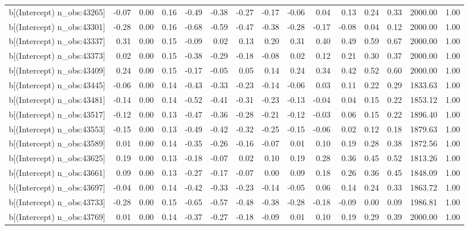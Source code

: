 \begin{table}[ht]
\begin{tabular}{rrrrrrrrrrrrrrr}
  b[(Intercept) n\_obs:43265] & -0.07 & 0.00 & 0.16 & -0.49 & -0.38 & -0.27 & -0.17 & -0.06 & 0.04 & 0.13 & 0.24 & 0.33 & 2000.00 & 1.00 \\ 
  b[(Intercept) n\_obs:43301] & -0.28 & 0.00 & 0.16 & -0.68 & -0.59 & -0.47 & -0.38 & -0.28 & -0.17 & -0.08 & 0.04 & 0.12 & 2000.00 & 1.00 \\ 
  b[(Intercept) n\_obs:43337] & 0.31 & 0.00 & 0.15 & -0.09 & 0.02 & 0.13 & 0.20 & 0.31 & 0.40 & 0.49 & 0.59 & 0.67 & 2000.00 & 1.00 \\ 
  b[(Intercept) n\_obs:43373] & 0.02 & 0.00 & 0.15 & -0.38 & -0.29 & -0.18 & -0.08 & 0.02 & 0.12 & 0.21 & 0.30 & 0.37 & 2000.00 & 1.00 \\ 
  b[(Intercept) n\_obs:43409] & 0.24 & 0.00 & 0.15 & -0.17 & -0.05 & 0.05 & 0.14 & 0.24 & 0.34 & 0.42 & 0.52 & 0.60 & 2000.00 & 1.00 \\ 
  b[(Intercept) n\_obs:43445] & -0.06 & 0.00 & 0.14 & -0.43 & -0.33 & -0.23 & -0.14 & -0.06 & 0.03 & 0.11 & 0.22 & 0.29 & 1833.63 & 1.00 \\ 
  b[(Intercept) n\_obs:43481] & -0.14 & 0.00 & 0.14 & -0.52 & -0.41 & -0.31 & -0.23 & -0.13 & -0.04 & 0.04 & 0.15 & 0.22 & 1853.12 & 1.00 \\ 
  b[(Intercept) n\_obs:43517] & -0.12 & 0.00 & 0.13 & -0.47 & -0.36 & -0.28 & -0.21 & -0.12 & -0.03 & 0.06 & 0.15 & 0.22 & 1896.40 & 1.00 \\ 
  b[(Intercept) n\_obs:43553] & -0.15 & 0.00 & 0.13 & -0.49 & -0.42 & -0.32 & -0.25 & -0.15 & -0.06 & 0.02 & 0.12 & 0.18 & 1879.63 & 1.00 \\ 
  b[(Intercept) n\_obs:43589] & 0.01 & 0.00 & 0.14 & -0.35 & -0.26 & -0.16 & -0.07 & 0.01 & 0.10 & 0.19 & 0.28 & 0.38 & 1872.56 & 1.00 \\ 
  b[(Intercept) n\_obs:43625] & 0.19 & 0.00 & 0.13 & -0.18 & -0.07 & 0.02 & 0.10 & 0.19 & 0.28 & 0.36 & 0.45 & 0.52 & 1813.26 & 1.00 \\ 
  b[(Intercept) n\_obs:43661] & 0.09 & 0.00 & 0.13 & -0.27 & -0.17 & -0.07 & 0.00 & 0.09 & 0.18 & 0.26 & 0.36 & 0.45 & 1848.09 & 1.00 \\ 
  b[(Intercept) n\_obs:43697] & -0.04 & 0.00 & 0.14 & -0.42 & -0.33 & -0.23 & -0.14 & -0.05 & 0.06 & 0.14 & 0.24 & 0.33 & 1863.72 & 1.00 \\ 
  b[(Intercept) n\_obs:43733] & -0.28 & 0.00 & 0.15 & -0.65 & -0.57 & -0.48 & -0.38 & -0.28 & -0.18 & -0.09 & 0.00 & 0.09 & 1986.81 & 1.00 \\ 
  b[(Intercept) n\_obs:43769] & 0.01 & 0.00 & 0.14 & -0.37 & -0.27 & -0.18 & -0.09 & 0.01 & 0.10 & 0.19 & 0.29 & 0.39 & 2000.00 & 1.00 \\ 

\end{tabular}
\end{table}
